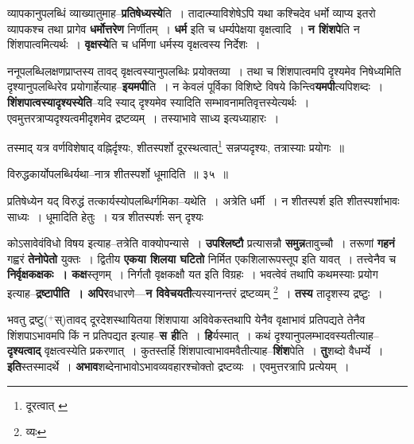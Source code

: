 \documentclass[article,12pt,a4paper]{memoir}
\newcommand{\add}[1]{($^{+}$#1)}
\begin{document}
	  \endgroup
	

	  \pstart व्यापकानुपलब्धिं व्याख्यातुमाह--\textbf{प्रतिषेध्यस्ये}ति । तादात्म्याविशेषेऽपि यथा कश्चिदेव धर्मो व्याप्य इतरो व्यापकश्च तथा प्रागेव \textbf{धर्मोत्तरेण} निर्णीतम् । \textbf{धर्म} इति च धर्म्यपेक्षया वृक्षत्वादि । \textbf{न शिंशपे}ति न शिंशपात्वमित्यर्थः । \textbf{वृक्षस्ये}ति च धर्मिणा धर्मस्य वृक्षत्वस्य निर्देशः ।
	\pend
      

	  \pstart ननूपलब्धिलक्षणप्राप्तस्य तावद् वृक्षत्वस्यानुपलब्धिः प्रयोक्तव्या । तथा च शिंशपात्वमपि दृश्यमेव निषेध्यमिति दृश्यानुपलब्धिरेव प्रयोगार्हेत्याह--\textbf{इयमपी}ति । न केवलं पूर्विका विशिष्टे विषये किन्त्वि\textbf{यमपी}त्यपिशब्दः । \textbf{शिंशपात्वस्यादृश्यस्येति}--यदि स्याद् दृश्यमेव स्यादिति सम्भावनामतिवृत्तस्येत्यर्थः । एवमुत्तरत्राप्यदृश्यत्वमीदृशमेव द्रष्टव्यम् । तस्याभावे साध्य इत्यध्याहारः ।
	\pend
	  \bigskip
	  \begingroup
	

	  \pstart तस्माद् यत्र वर्णविशेषाद् वह्निर्दृश्यः, शीतस्पर्शो दूरस्थत्वात्\footnote{दूरत्वात् \cite{dp-msB} \cite{dp-msD}} सन्नप्यदृश्यः, तत्रास्याः प्रयोगः ॥
	\pend
       
	  \bigskip
	  \begingroup
	

	  \pstart विरुद्धकार्योपलब्धिर्यथा--नात्र शीतस्पर्शो धूमादिति ॥ ३५ ॥
	\pend
      
	  \endgroup
	 

	  \pstart प्रतिषेध्येन यद् विरुद्धं तत्कार्यस्योपलब्धिर्गमिका--यथेति । अत्रेति धर्मी । न शीतस्पर्श इति शीतस्पर्शाभावः साध्यः । धूमादिति हेतुः । यत्र शीतस्पर्शः सन् दृश्यः
	\pend
      
	  \endgroup
	

	  \pstart कोऽसावेवंविधो विषय इत्याह--तत्रेति वाक्योपन्यासे । \textbf{उपश्लिष्टौ} प्रत्यासन्नौ \textbf{समुन्न}तावुच्चौ । तरूणां \textbf{गहनं} गह्वरं \textbf{तेनोपेतो} युक्तः । द्वितीय \textbf{एकया शिलया घटितो} निर्मित एकशिलारूपस्तूप इति यावत् । तत्त्वेनैव च \textbf{निर्वृक्षकक्षकः । कक्ष}स्तृणम् । निर्गतौ वृक्षकक्षौ यत इति विग्रहः । भवत्वेवं तथापि कथमस्याः प्रयोग इत्याह--\textbf{द्रष्टापीति । अपिर}वधारणे—\textbf{न विवेचयती}त्यस्यानन्तरं द्रष्टव्यम् \footnote{व्यः} । \textbf{तस्य} तादृशस्य द्रष्टुः ।
	\pend
      

	  \pstart भवतु द्रष्टु\add{स्}तावद् दूरदेशस्थायितया शिंशपाया अविवेकस्तथापि येनैव वृक्षाभावं प्रतिपद्यते तेनैव शिंशपाऽभावमपि किं न प्रतिपद्यत इत्याह--\textbf{स ही}ति । \textbf{हि}र्यस्मात् । कथं दृश्यानुपलम्भादवस्यतीत्याह--\textbf{दृश्यत्वाद्} वृक्षत्वस्येति प्रकरणात् । कुतस्तर्हि शिंशपा\leavevmode{}त्वाभावमवैतीत्याह--\textbf{शिंश}पेति । \textbf{तु}शब्दो वैधर्म्ये । \textbf{इति}स्तस्मादर्थे । \textbf{अभाव}शब्देनाभावोऽभावव्यवहारश्चोक्तो द्रष्टव्यः । एवमुत्तरत्रापि प्रत्येयम् ।
	\pend
      
\end{document}
